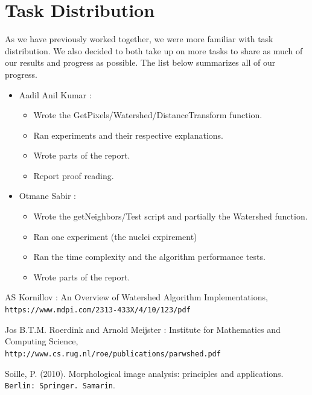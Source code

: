 \documentclass{article}
\begin{document}
\section{Task Distribution}
\begin{flushleft}
As we have previously worked together, we were more familiar with task distribution. We also decided to both take up on more tasks to share as much of our results and progress as possible. The list below summarizes all of our progress.
\end{flushleft}

\begin{itemize}
    \item Aadil Anil Kumar :
    \begin{itemize}
        \item Wrote the GetPixels/Watershed/DistanceTransform function.
        \item Ran experiments and their respective explanations.
        \item Wrote parts of the report.
        \item Report proof reading.
    \end{itemize}
    \item Otmane Sabir :
    \begin{itemize}
        \item Wrote the getNeighbors/Test script and partially the Watershed function.
        \item Ran one experiment (the nuclei expirement)
        \item Ran the time complexity and the algorithm performance tests.
        \item Wrote parts of the report.
    \end{itemize}
\end{itemize}

\newpage

\begin{thebibliography}{9}
\label{sec:hello}

AS Kornillov : \newline
An Overview of Watershed Algorithm Implementations, 
\\\texttt{https://www.mdpi.com/2313-433X/4/10/123/pdf}


Jos B.T.M. Roerdink and Arnold Meijster : \newline
Institute for Mathematics and Computing Science, 
\\\texttt{http://www.cs.rug.nl/roe/publications/parwshed.pdf}


Soille, P. (2010). Morphological image analysis: principles and applications. 
\texttt{Berlin: Springer. Samarin}. 



\end{thebibliography}
\end{document}
